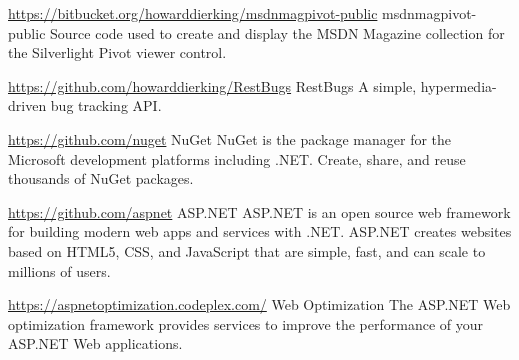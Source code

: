 \begin{cventries}

\cventry
{\url{https://bitbucket.org/howarddierking/msdnmagpivot-public}}  %
{msdnmagpivot-public}  %
{\enskip} %
{\enskip} %
{
  Source code used to create and display the MSDN Magazine collection for the Silverlight Pivot viewer control.
}


\cventry
{\url{https://github.com/howarddierking/RestBugs}}  %
{RestBugs}  %
{\enskip} %
{\enskip} %
{
  A simple, hypermedia-driven bug tracking API.
}


\cventry
{\url{https://github.com/nuget}}  %
{NuGet}  %
{\enskip} %
{\enskip} %
{
  NuGet is the package manager for the Microsoft development platforms including .NET. Create, share, and reuse thousands of NuGet packages.
}


\cventry
{\url{https://github.com/aspnet}}  %
{ASP.NET}  %
{\enskip} %
{\enskip} %
{
  ASP.NET is an open source web framework for building modern web apps and services with .NET. ASP.NET creates websites based on HTML5, CSS, and JavaScript that are simple, fast, and can scale to millions of users.
}


\cventry
{\url{https://aspnetoptimization.codeplex.com/}}  %
{Web Optimization}  %
{\enskip} %
{\enskip} %
{
  The ASP.NET Web optimization framework provides services to improve the performance of your ASP.NET Web applications.
}

\end{cventries}